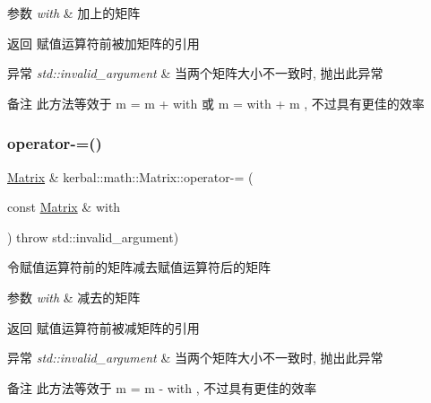 \begin{DoxyParams}{参数}
{\em with} & 加上的矩阵 \\
\hline
\end{DoxyParams}
\begin{DoxyReturn}{返回}
赋值运算符前被加矩阵的引用 
\end{DoxyReturn}

\begin{DoxyExceptions}{异常}
{\em std\+::invalid\+\_\+argument} & 当两个矩阵大小不一致时, 抛出此异常 \\
\hline
\end{DoxyExceptions}
\begin{DoxyRemark}{备注}
此方法等效于 m = m + with 或 m = with + m , 不过具有更佳的效率 
\end{DoxyRemark}
\mbox{\label{classkerbal_1_1math_1_1_matrix_a4fcc469526f1c13aab912278ba69dd85}} 
\subsubsection{\texorpdfstring{operator-\/=()}{operator-=()}}
{\footnotesize\ttfamily \hyperlink{classkerbal_1_1math_1_1_matrix}{Matrix} \& kerbal\+::math\+::\+Matrix\+::operator-\/= (\begin{DoxyParamCaption}\item[{const \hyperlink{classkerbal_1_1math_1_1_matrix}{Matrix} \&}]{with }\end{DoxyParamCaption}) throw  std\+::invalid\+\_\+argument) }



令赋值运算符前的矩阵减去赋值运算符后的矩阵 


\begin{DoxyParams}{参数}
{\em with} & 减去的矩阵 \\
\hline
\end{DoxyParams}
\begin{DoxyReturn}{返回}
赋值运算符前被减矩阵的引用 
\end{DoxyReturn}

\begin{DoxyExceptions}{异常}
{\em std\+::invalid\+\_\+argument} & 当两个矩阵大小不一致时, 抛出此异常 \\
\hline
\end{DoxyExceptions}
\begin{DoxyRemark}{备注}
此方法等效于 m = m -\/ with , 不过具有更佳的效率 
\end{DoxyRemark}
\mbox{\label{classkerbal_1_1math_1_1_matrix_a47ee8c0afe98e4545233b10f7f7774e8}} 
